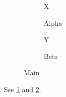 \documentclass{article}
\begin{document}
\begin{figure}
\begin{subfigure}{0.4\textwidth}X\caption{Alpha}\label{a}\end{subfigure}
\begin{subfigure}{0.4\textwidth}Y\caption{Beta}\label{b}\end{subfigure}
\caption{Main}\label{m}
\end{figure}
See \ref{a} and \ref{b}.
\end{document}
